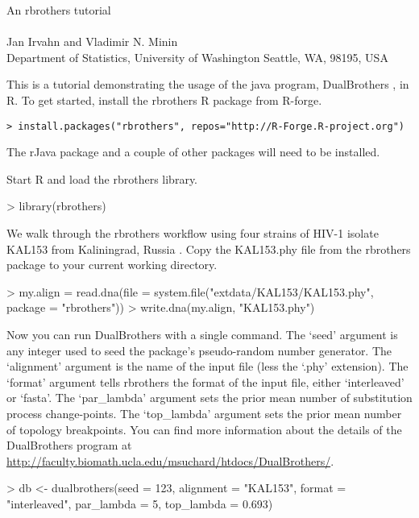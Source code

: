 \documentclass[12pt]{article}
\begin{document}
\begin{center}
  {\LARGE An rbrothers tutorial}\\\ \\
  {Jan Irvahn and Vladimir N. Minin \\ 
    Department of Statistics, University of Washington Seattle, WA, 98195, USA
  }
\end{center}

This is a tutorial demonstrating the usage of the java program, DualBrothers \cite{minin2005dual}, in R.  To get started, install the rbrothers R package from R-forge. 
\begin{verbatim}
> install.packages("rbrothers", repos="http://R-Forge.R-project.org")
\end{verbatim}
The rJava package and a couple of other packages will need to be installed.

Start R and load the rbrothers library.
\begin{Schunk}
\begin{Sinput}
> library(rbrothers)
\end{Sinput}
\end{Schunk}

We walk through the rbrothers workflow using four strains of HIV-1 isolate KAL153 from Kaliningrad, Russia \cite{liitsola1998hiv}. Copy the KAL153.phy file from the rbrothers package to your current working directory.
\begin{Schunk}
\begin{Sinput}
> my.align = read.dna(file = system.file("extdata/KAL153/KAL153.phy", 
     package = "rbrothers"))
> write.dna(my.align, "KAL153.phy")
\end{Sinput}
\end{Schunk}

Now you can run DualBrothers with a single command. The `seed' argument is any integer used to seed the package's pseudo-random number generator. The `alignment' argument is the name of the input file (less the `.phy' extension). The `format' argument tells rbrothers the format of the input file, either `interleaved' or `fasta'. The `par\_lambda' argument sets the prior mean number of substitution process change-points. The `top\_lambda' argument sets the prior mean number of topology breakpoints. You can find more information about the details of the DualBrothers program at \url{http://faculty.biomath.ucla.edu/msuchard/htdocs/DualBrothers/}. 

\begin{Schunk}
\begin{Sinput}
> db <- dualbrothers(seed = 123, alignment = "KAL153", 
     format = "interleaved", par_lambda = 5, top_lambda = 0.693)
\end{Sinput}
\end{Schunk}
\end{document}
